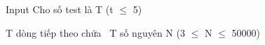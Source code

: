 Input
Cho số test là T (t  $\le$  5)

T dòng tiếp theo chứa  T số nguyên N (3  $\le$  N  $\le$  50000)